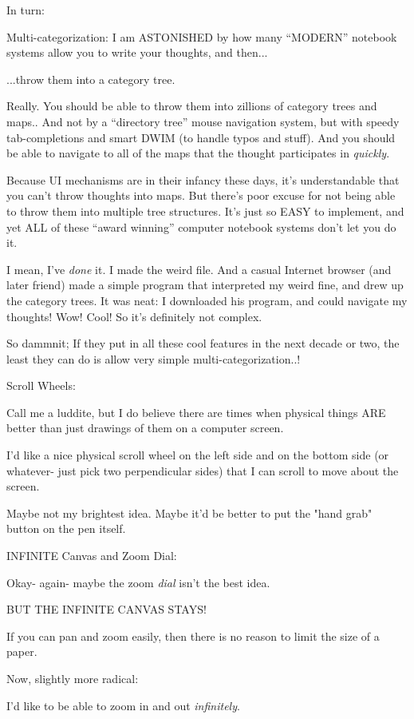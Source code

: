 \documentclass[oneside]{book}
\begin{document}
In turn:

Multi-categorization:
I am ASTONISHED by how many ``MODERN'' notebook systems allow you to
write your thoughts, and then...

...throw them into a category tree.

Really. You should be able to throw them into zillions of category
trees and maps.. And not by a ``directory tree'' mouse navigation
system, but with speedy tab-completions and smart DWIM (to handle
typos and stuff). And you should be able to navigate to all of the
maps that the thought participates in \emph{quickly}.

Because UI mechanisms are in their infancy these days, it's
understandable that you can't throw thoughts into maps. But there's
poor excuse for not being able to throw them into multiple tree
structures. It's just so EASY to implement, and yet ALL of these
``award winning'' computer notebook systems don't let you do it.

I mean, I've \emph{done} it. I made the weird file. And a casual Internet
browser (and later friend) made a simple program that interpreted my
weird fine, and drew up the category trees. It was neat: I downloaded
his program, and could navigate my thoughts! Wow! Cool! So it's
definitely not complex.

So dammnit; If they put in all these cool features in the next decade
or two, the least they can do is allow very simple
multi-categorization..!

Scroll Wheels:

Call me a luddite, but I do believe there are times when physical
things ARE better than just drawings of them on a computer screen.

I'd like a nice physical scroll wheel on the left side and on the
bottom side (or whatever- just pick two perpendicular sides) that I
can scroll to move about the screen.

Maybe not my brightest idea. Maybe it'd be better to put the "hand
grab" button on the pen itself.

INFINITE Canvas and Zoom Dial:

Okay- again- maybe the zoom \emph{dial} isn't the best idea.

BUT THE INFINITE CANVAS STAYS!

If you can pan and zoom easily, then there is no reason to limit the
size of a paper.

Now, slightly more radical:

I'd like to be able to zoom in and out \emph{infinitely}.
\end{document}
